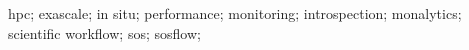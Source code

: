 \begin{IEEEkeywords} %
hpc;
exascale;
in situ;
performance;
monitoring;
introspection;
monalytics;
scientific workflow;
sos;
sosflow;
\end{IEEEkeywords}


\IEEEpeerreviewmaketitle


